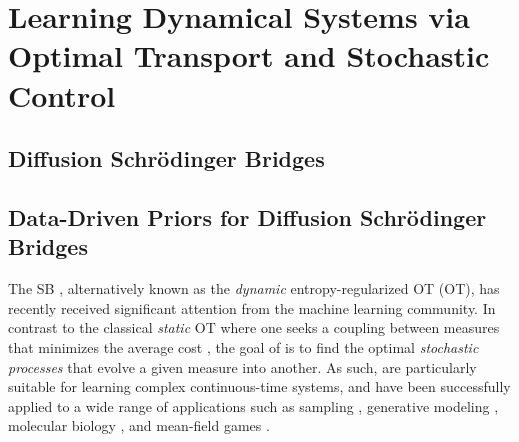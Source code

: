 \chapter[Learning Dynamical Systems via OT and Stochastic Control]{Learning Dynamical Systems via Optimal Transport and Stochastic Control}
\label{cha:neural_sde}

%


\section{Diffusion Schr\"odinger Bridges}





\section{Data-Driven Priors for Diffusion Schr\"odinger Bridges}

The \acrfull{SB} \citep{leonard2013survey, chen2021stochastic}, alternatively known as the \emph{dynamic} entropy-regularized \acrlong{OT} (OT), has recently received significant attention from the machine learning community. In contrast to the classical \emph{static} \acrshort{OT} where one seeks a {coupling} between measures that minimizes the average cost \citep{villani2009optimal,peyre2019computational}, the goal of  is to find the optimal \emph{stochastic processes} that evolve a given measure into another. As such,  are particularly suitable for learning complex continuous-time systems, and have been successfully applied to a wide range of applications such as sampling \citep{bernton2019schr, huang2021schrodinger}, generative modeling \citep{chen2021likelihood,de2021diffusion,wang2021deep}, molecular biology \citep{holdijk2022path}, and mean-field games \citep{liu2022deep}. 



